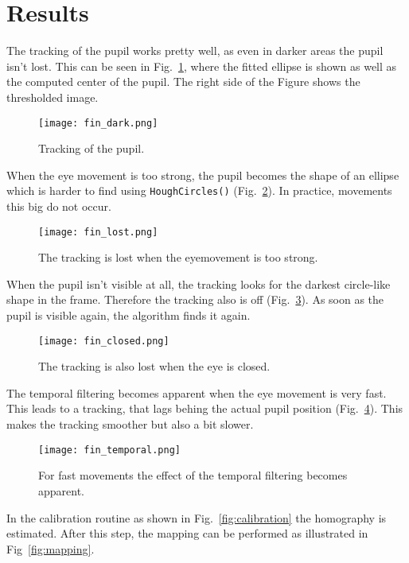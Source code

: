 \section{Results}\label{results}

The tracking of the pupil works pretty well, as even in darker areas the pupil isn't lost. This can be seen in Fig.~\ref{fig:pupil1}, where the fitted ellipse is shown as well as the computed center of the pupil. The right side of the Figure shows the thresholded image.

\begin{figure}[h]
  \centering
  \texttt{[image: fin\_dark.png]}
  \caption{Tracking of the pupil.}\label{fig:pupil1}
\end{figure}

When the eye movement is too strong, the pupil becomes the shape of an ellipse which is harder to find using \texttt{HoughCircles()} (Fig.~\ref{fig:pupillost}). In practice, movements this big do not occur.

\begin{figure}[h]
  \centering
  \texttt{[image: fin\_lost.png]}
  \caption{The tracking is lost when the eyemovement is too strong.}\label{fig:pupillost}
\end{figure}

When the pupil isn't visible at all, the tracking looks for the darkest circle-like shape in the frame. Therefore the tracking also is off (Fig.~\ref{fig:pupilclosed}). As soon as the pupil is visible again, the algorithm finds it again.

\begin{figure}[h]
  \centering
  \texttt{[image: fin\_closed.png]}
  \caption{The tracking is also lost when the eye is closed.}\label{fig:pupilclosed}
\end{figure}

The temporal filtering becomes apparent when the eye movement is very fast. This leads to a tracking, that lags behing the actual pupil position (Fig.~\ref{fig:pupiltemporal}). This makes the tracking smoother but also a bit slower.

\begin{figure}[h]
  \centering
  \texttt{[image: fin\_temporal.png]}
  \caption{For fast movements the effect of the temporal filtering becomes apparent.}\label{fig:pupiltemporal}
\end{figure}

In the calibration routine as shown in Fig.~\ref{fig:calibration} the homography is estimated.
After this step, the mapping can be performed as illustrated in Fig~\ref{fig:mapping}.


